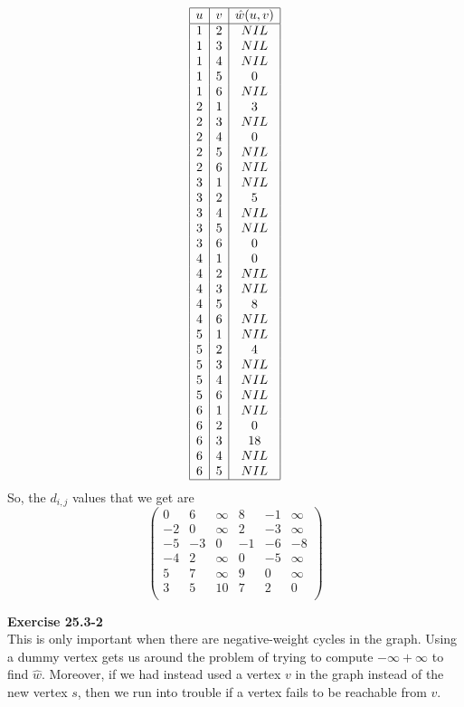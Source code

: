\documentclass{article}
\begin{document}
\[
\begin{array}{|c|c|c|}
\hline
u&v&\hat{w}(u,v)\\
\hline
1&2&NIL\\
1&3&NIL\\
1&4&NIL\\
1&5&0\\
1&6&NIL\\
2&1&3\\
2&3&NIL\\
2&4&0\\
2&5&NIL\\
2&6&NIL\\
3&1&NIL\\
3&2&5\\
3&4&NIL\\
3&5&NIL\\
3&6&0\\
4&1&0\\
4&2&NIL\\
4&3&NIL\\
4&5&8\\
4&6&NIL\\
5&1&NIL\\
5&2&4\\
5&3&NIL\\
5&4&NIL\\
5&6&NIL\\
6&1&NIL\\
6&2&0\\
6&3&18\\
6&4&NIL\\
6&5&NIL\\
\hline
\end{array}
\]
So, the $d_{i,j}$ values that we get are
\[
\left(\begin{array}{cccccc}
0&6&\infty&8&-1&\infty\\
-2&0&\infty&2&-3&\infty\\
-5&-3&0&-1&-6&-8\\
-4&2&\infty&0&-5&\infty\\
5&7&\infty&9&0&\infty\\
3&5&10&7&2&0\\
\end{array}
\right)
\]


\noindent\textbf{Exercise 25.3-2}\\

This is only important when there are negative-weight cycles in the graph.  Using a dummy vertex gets us around the problem of trying to compute $-\infty + \infty$ to find $\hat{w}$.   Moreover, if we had instead used a vertex $v$ in the graph instead of the new vertex $s$, then we run into trouble if a vertex fails to be reachable from $v$.\\
\end{document}
